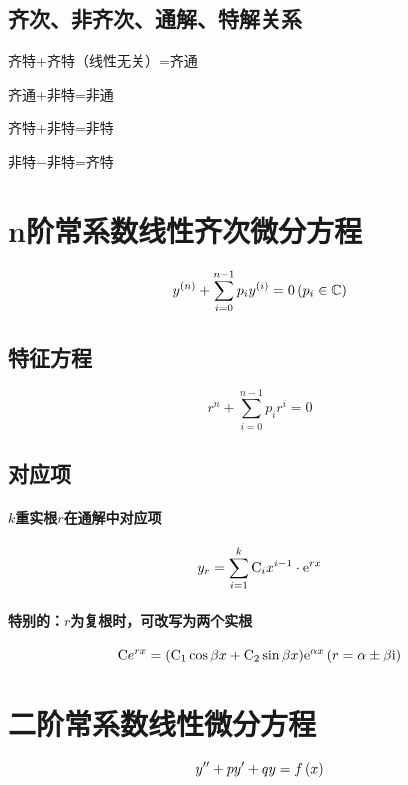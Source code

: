 \documentclass{article}
\begin{document}
\subsection{齐次、非齐次、通解、特解关系}

齐特+齐特（线性无关）=齐通

齐通+非特=非通

齐特+非特=非特

非特$-$非特=齐特

\section{n阶常系数线性齐次微分方程}

\begin{definition}[]
    \[y^{\left(n\right)}+\sum_{i=0}^{n-1}p_iy^{\left(i\right)}=0\left(p_i\in\mathbb C\right)\]
\end{definition}

\subsection{特征方程}

\[r^n+\sum_{i=0}^{n-1}p_ir^i=0\]

\subsection{对应项}

\paragraph{$k$重实根$r$在通解中对应项}

\[y_r=\sum_{i=1}^k\mathrm C_ix^{i-1}\cdot\mathrm e^{rx}\]

\paragraph{特别的：$r$为复根时，可改写为两个实根}

\[\mathrm C e^{rx}=(\mathrm C_1\cos{\beta x}+\mathrm C_2\sin{\beta x})\mathrm e^{\alpha x}\left(r=\alpha\pm\beta \mathrm i\right)\]

\section{二阶常系数线性微分方程}

\begin{definition}[]
    \[y^{\prime\prime}+py^\prime+qy=f\left(x\right)\label{二阶常系数线性微分方程}\]
\end{definition}
\end{document}
